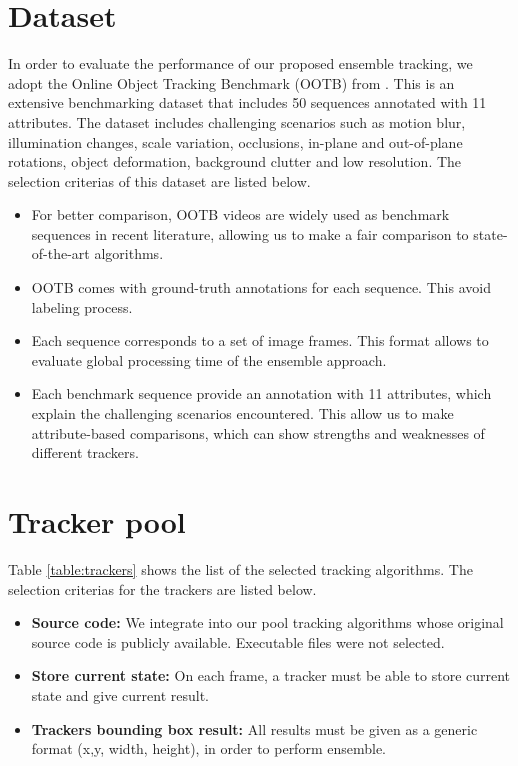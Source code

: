 \section{Dataset}
In order to evaluate the performance of our proposed ensemble tracking,
we adopt the Online Object Tracking Benchmark (OOTB) from \cite{Wu2013}.
This is an extensive benchmarking dataset that includes 50 sequences
annotated with 11 attributes.
The dataset includes challenging scenarios such as motion blur,
illumination changes, scale variation, occlusions,
in-plane and out-of-plane rotations, object deformation,
background clutter and low resolution. The selection criterias of this dataset
are listed below. 
\begin{itemize}
\item For better comparison, OOTB videos are widely used as benchmark sequences
in recent literature, allowing us to make a fair comparison to state-of-the-art
algorithms.
\item OOTB comes with ground-truth annotations for each sequence. This avoid
labeling process.
\item Each sequence corresponds to a set of image frames. This format allows to
evaluate global processing time of the ensemble approach.
\item Each benchmark sequence provide an annotation with 11 attributes, which
explain the challenging scenarios encountered. This allow us to make
attribute-based comparisons, which can show strengths and weaknesses
of different trackers.

\end{itemize}

\section{Tracker pool}

Table \ref{table:trackers} shows the list of the
selected tracking algorithms. The selection criterias for the trackers are
listed below.
\begin{itemize}
\item \textbf{Source code: } We integrate into our pool tracking algorithms
whose original source code is publicly available. Executable files were not
selected.
\item \textbf{Store current state: } On each frame, a tracker must be able to
store current state and give current result.
\item \textbf{Trackers bounding box result: } All results must be given as
a generic format (x,y, width, height), in order to perform ensemble.
\end{itemize}

